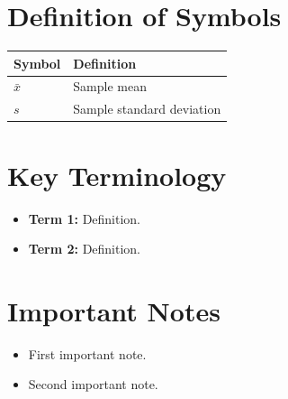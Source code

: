 \documentclass[11pt]{article}
\begin{document}
\section*{Definition of Symbols}
{\small
\begin{center}
\begin{tabular}{l l}
\toprule
\textbf{Symbol} & \textbf{Definition} \\
\midrule
$\bar{x}$ & Sample mean \\
$s$ & Sample standard deviation \\
\bottomrule
\end{tabular}
\end{center}
}

\section*{Key Terminology}
\begin{itemize}[nosep]
    \item \textbf{Term 1:} Definition.
    \item \textbf{Term 2:} Definition.
\end{itemize}

\section*{Important Notes}
\begin{itemize}[nosep]
    \item First important note.
    \item Second important note.
\end{itemize}
\end{document}
